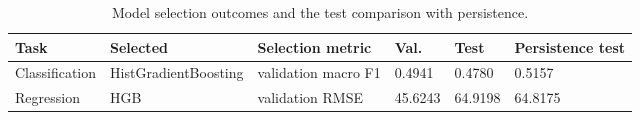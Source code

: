 \begin{table}[htbp]
\centering
\small
\caption{Model selection outcomes and the test comparison with persistence.}
\label{tab:model-selection}
\begin{tabular}{llllll}
\toprule
Task & Selected & Selection metric & Val. & Test & Persistence test \\
\midrule
Classification & HistGradientBoosting & validation macro F1 & 0.4941 & 0.4780 & 0.5157 \\
Regression & HGB & validation RMSE & 45.6243 & 64.9198 & 64.8175 \\
\bottomrule
\end{tabular}

\end{table}
